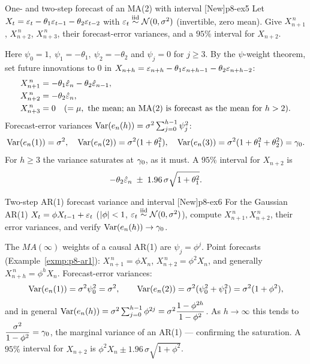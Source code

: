 \begin{exercise}{One- and two-step forecast of an MA(2) with interval \quad\textnormal{[New]}}{p8-ex5}
Let $X_t=\varepsilon_t-\theta_1\varepsilon_{t-1}-\theta_2\varepsilon_{t-2}$ with
$\varepsilon_t\overset{\text{iid}}{\sim}\mathcal N(0,\sigma^2)$ (invertible, zero mean). Give
$X^{\,n}_{n+1}$, $X^{\,n}_{n+2}$, $X^{\,n}_{n+3}$, their forecast-error
variances, and a $95\%$ interval for $X_{n+2}$.
\end{exercise}
\begin{solution}
Here $\psi_0=1,\ \psi_1=-\theta_1,\ \psi_2=-\theta_2$ and $\psi_j=0$ for
$j\ge3$. By the $\psi$-weight theorem, set future innovations to $0$ in
$X_{n+h}=\varepsilon_{n+h}-\theta_1\varepsilon_{n+h-1}-\theta_2\varepsilon_{n+h-2}$:
\[
\begin{aligned}
X^{\,n}_{n+1}&=-\theta_1\hat{\varepsilon}_n-\theta_2\hat{\varepsilon}_{n-1},\\
X^{\,n}_{n+2}&=-\theta_2\hat{\varepsilon}_n,\\
X^{\,n}_{n+3}&=0\quad(=\mu,\ \text{the mean; an MA(2) is forecast as the mean for }h>2).
\end{aligned}
\]
Forecast-error variances $\operatorname{Var}(e_n(h))=\sigma^2\sum_{j=0}^{h-1}\psi_j^2$:
\[
\operatorname{Var}(e_n(1))=\sigma^2,\quad
\operatorname{Var}(e_n(2))=\sigma^2(1+\theta_1^2),\quad
\operatorname{Var}(e_n(3))=\sigma^2(1+\theta_1^2+\theta_2^2)=\gamma_0 .
\]
For $h\ge3$ the variance saturates at $\gamma_0$, as it must. A $95\%$ interval
for $X_{n+2}$ is
\[
-\theta_2\hat{\varepsilon}_n\;\pm\;1.96\,\sigma\sqrt{1+\theta_1^2}.
\]
\end{solution}

\begin{exercise}{Two-step AR(1) forecast variance and interval \quad\textnormal{[New]}}{p8-ex6}
For the Gaussian AR(1) $X_t=\phi X_{t-1}+\varepsilon_t$ ($\left\lvert \phi \right\rvert<1$,
$\varepsilon_t\overset{\text{iid}}{\sim}\mathcal N(0,\sigma^2)$), compute $X^{\,n}_{n+1},X^{\,n}_{n+2}$,
their error variances, and verify $\operatorname{Var}(e_n(h))\to\gamma_0$.
\end{exercise}
\begin{solution}
The $MA(\infty)$ weights of a causal AR(1) are $\psi_j=\phi^j$. Point forecasts
(Example~\ref{exmp:p8-ar1}): $X^{\,n}_{n+1}=\phi X_n$,
$X^{\,n}_{n+2}=\phi^2X_n$, and generally $X^{\,n}_{n+h}=\phi^hX_n$.
Forecast-error variances:
\[
\operatorname{Var}(e_n(1))=\sigma^2\psi_0^2=\sigma^2,
\qquad
\operatorname{Var}(e_n(2))=\sigma^2(\psi_0^2+\psi_1^2)=\sigma^2(1+\phi^2),
\]
and in general
$\operatorname{Var}(e_n(h))=\sigma^2\sum_{j=0}^{h-1}\phi^{2j}=\sigma^2\dfrac{1-\phi^{2h}}{1-\phi^2}$.
As $h\to\infty$ this tends to $\dfrac{\sigma^2}{1-\phi^2}=\gamma_0$, the marginal
variance of an AR(1) --- confirming the saturation. A $95\%$ interval for
$X_{n+2}$ is $\phi^2X_n\pm1.96\,\sigma\sqrt{1+\phi^2}$.
\end{solution}

